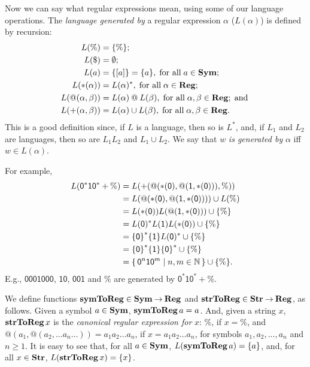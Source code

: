 Now we can say what regular expressions mean, using some of our
language operations.  The \emph{language generated by} a regular
expression $\alpha$ ($L(\alpha)$) is defined by recursion:
%
%
%
\begin{align*}
L(\%) &= \{\%\} ; \\
L(\$) &= \emptyset ; \\
L(a) &= \{[a]\} = \{a\}, \;\allowbreak\mbox{for all}\allowbreak\;a\in\mathbf{Sym} ; \\
L({*}(\alpha)) &= L(\alpha)^* , \;\allowbreak\mbox{for all}\allowbreak\;\alpha\in\mathbf{Reg} ; \\
L(@(\alpha,\beta)) &= L(\alpha)\mathbin{@} L(\beta) ,
\;\allowbreak\mbox{for all}\allowbreak\;\alpha,\beta\in\mathbf{Reg} ; \;\allowbreak\mbox{and}\allowbreak\; \\
L({+}(\alpha,\beta)) &= L(\alpha)\cup L(\beta) ,
\;\allowbreak\mbox{for all}\allowbreak\;\alpha,\beta\in\mathbf{Reg} .
\end{align*}
This is a good definition since, if $L$ is a language, then so is
$L^*$, and, if $L_1$ and $L_2$ are languages, then so are $L_1L_2$ and
$L_1\cup L_2$.  We say that $w$ \emph{is generated by} $\alpha$ iff
$w\in L(\alpha)$.

For example,
\begin{align*}
L(\mathsf{0^*10^*+\%}) &=
L(\mathsf{{+}(@({*}(0),@(1,{*}(0))),\%)}) \\
&= L(\mathsf{@({*}(0),@(1,{*}(0)))})\cup L(\%) \\
&= L(\mathsf{{*}(0)})L(\mathsf{@(1,{*}(0))})\cup \{\%\} \\
&= L(\mathsf{0})^* L(\mathsf{1}) L(\mathsf{{*}(0)}) \cup \{\%\} \\
&= \mathsf{\{0\}}^* \mathsf{\{1\}} L(\mathsf{0})^*
  \cup \{\%\} \\
&= \mathsf{\{0\}}^* \mathsf{\{1\}} \mathsf{\{0\}}^* 
  \cup \{\%\} \\
&= \{ \, {\mathsf 0}^n{\mathsf 1}{\mathsf 0}^m \mid n,m\in\mathbb{N} \, \} \cup
\{\%\} .
\end{align*}
E.g., $\mathsf{0001000}$, $\mathsf{10}$,
$\mathsf{001}$ and $\%$ are generated by $\mathsf{0^*10^*+\%}$.

We define functions $\mathbf{symToReg}\in\mathbf{Sym}\mathbin{\to}\mathbf{Reg}$ and
$\mathbf{strToReg}\in\mathbf{Str}\mathbin{\to}\mathbf{Reg}$, as follows.  Given a symbol $a\in\mathbf{Sym}$,
$\mathbf{symToReg}\,a = a$. And, given a string $x$, $\mathbf{strToReg}\,x$ is the
\emph{canonical regular expression for} $x$: $\%$, if $x = \%$, and
${@}(a_1, {@}(a_2, \ldots a_n \ldots)) = a_1a_2\ldots a_n$, if $x =
a_1a_2\ldots a_n$, for symbols $a_1,a_2,\ldots,a_n$ and $n\geq 1$.  It
is easy to see that, for all $a\in\mathbf{Sym}$, $L(\mathbf{symToReg}\,a)=\{a\}$, and,
for all $x\in\mathbf{Str}$, $L(\mathbf{strToReg}\,x)=\{x\}$.

